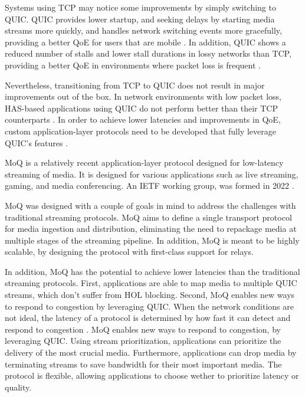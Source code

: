 Systems using TCP may notice some improvements by simply switching to QUIC. QUIC provides lower startup, and seeking delays by starting media streams more quickly, and handles network switching events more gracefully, providing a better \ac{QoE} for users that are mobile \parencite{arisuQuicklyStartingMedia2018}. In addition, QUIC shows a reduced number of stalls and lower stall durations in lossy networks than TCP, providing a better \ac{QoE} in environments where packet loss is frequent \parencite{shreedharEvaluatingQUICPerformance2022}.

Nevertheless, transitioning from TCP to QUIC does not result in major improvements out of the box. In network environments with low packet loss, HAS-based applications using QUIC do not perform better than their TCP counterparts \parencite{timmererAdvancedTransportOptions2016}. In order to achieve lower latencies and improvements in QoE, custom application-layer protocols need to be developed that fully leverage QUIC's features \parencite{nguyenTakeRedPill2022}.

\ac{MoQ} is a relatively recent application-layer protocol designed for low-latency streaming of media. It is designed for various applications such as live streaming, gaming, and media conferencing. An IETF working group, was formed in 2022 \parencite{MediaQUICMoq}. 

\ac{MoQ} was designed with a couple of goals in mind to address the challenges with traditional streaming protocols. \ac{MoQ} aims to define a single transport protocol for media ingestion and distribution, eliminating the need to repackage media at multiple stages of the streaming pipeline. In addition, \ac{MoQ} is meant to be highly scalable, by designing the protocol with first-class support for relays. 

In addition, \ac{MoQ} has the potential to achieve lower latencies than the traditional streaming protocols. First, applications are able to map media to multiple QUIC streams, which don't suffer from \ac{HOL} blocking. Second, MoQ enables new ways to respond to congestion by leveraging QUIC. When the network conditions are not ideal, the latency of a protocol is determined by how fast it can detect and respond to congestion \parencite{curleyMediaQUICTransport2024}. MoQ enables new ways to respond to congestion, by leveraging QUIC. Using stream prioritization, applications can prioritize the delivery of the most crucial media. Furthermore, applications can drop media by terminating streams to save bandwidth for their most important media. The protocol is flexible, allowing applications to choose wether to prioritize latency or quality.

